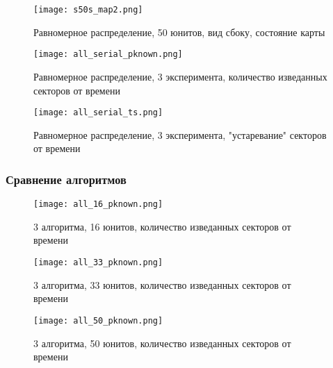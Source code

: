 \begin{figure}[h!]
    \centering
    \texttt{[image: s50s\_map2.png]}
    \caption{Равномерное распределение, 50 юнитов, вид сбоку, состояние карты}
\end{figure}

\begin{figure}[h!]
    \centering
    \texttt{[image: all\_serial\_pknown.png]}
    \caption{Равномерное распределение, 3 эксперимента, количество изведанных секторов от времени}
\end{figure}

\begin{figure}[h!]
    \centering
    \texttt{[image: all\_serial\_ts.png]}
    \caption{Равномерное распределение, 3 эксперимента, "устаревание" секторов от времени}
\end{figure}

\clearpage
\newpage

\subsubsection{Сравнение алгоритмов}

\begin{figure}[h!]
    \centering
    \texttt{[image: all\_16\_pknown.png]}
    \caption{3 алгоритма, 16 юнитов, количество изведанных секторов от времени}
\end{figure}

\begin{figure}[h!]
    \centering
    \texttt{[image: all\_33\_pknown.png]}
    \caption{3 алгоритма, 33 юнитов, количество изведанных секторов от времени}
\end{figure}

\begin{figure}[h!]
    \centering
    \texttt{[image: all\_50\_pknown.png]}
    \caption{3 алгоритма, 50 юнитов, количество изведанных секторов от времени}
\end{figure}

\clearpage
\newpage
